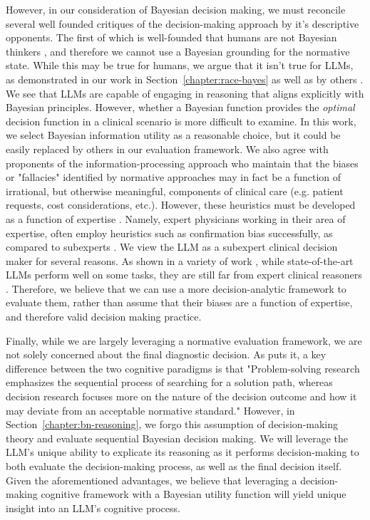 However, in our consideration of Bayesian decision making, we must reconcile several well founded critiques of the decision-making approach by it's descriptive opponents. The first of which is well-founded that humans are not Bayesian thinkers \citep{gigerenzerToolsTheoriesHeuristic1991}, and therefore we cannot use a Bayesian grounding for the normative state. While this may be true for humans, we argue that it isn't true for LLMs, as demonstrated in our work in Section~\ref{chapter:race-bayes} as well as by others \cite{nafarProbabilisticReasoningGenerative2024b}. We see that LLMs are capable of engaging in reasoning that aligns explicitly with Bayesian principles. However, whether a Bayesian function provides the \emph{optimal} decision function in a clinical scenario is more difficult to examine. In this work, we select Bayesian information utility as a reasonable choice, but it could be easily replaced by others in our evaluation framework. We also agree with proponents of the information-processing approach who maintain that the biases or "fallacies" identified by normative approaches may in fact be a function of irrational, but otherwise meaningful, components of clinical care (e.g. patient requests, cost considerations, etc.). However, these heuristics must be developed as a function of expertise \cite{patel1991general}. Namely, expert physicians working in their area of expertise, often employ heuristics such as confirmation bias successfully, as compared to subexperts \cite{patelEmergingParadigmsCognition2002}. We view the LLM as a subexpert clinical decision maker for several reasons. As shown in a variety of work \cite{rydzewski2024comparative}, while state-of-the-art LLMs perform well on some tasks, they are still far from expert clinical reasoners \cite{harrisLargeLanguageModels2023}. Therefore, we believe that we can use a more decision-analytic framework to evaluate them, rather than assume that their biases are a function of expertise, and therefore valid decision making practice.

Finally, while we are largely leveraging a normative evaluation framework, we are not solely concerned about the final diagnostic decision. As \citet{patelEmergingParadigmsCognition2002} puts it, a key difference between the two cognitive paradigms is that "Problem-solving research emphasizes the sequential process of searching for a solution path, whereas decision research focuses more on the nature of the decision outcome and how it may deviate from an acceptable normative standard." However, in Section~\ref{chapter:bn-reasoning}, we forgo this assumption of decision-making theory and evaluate sequential Bayesian decision making. We will leverage the LLM's unique ability to explicate its reasoning as it performs decision-making to both evaluate the decision-making process, as well as the final decision itself. Given the aforementioned advantages, we believe that leveraging a decision-making cognitive framework with a Bayesian utility function will yield unique insight into an LLM's cognitive process. 

